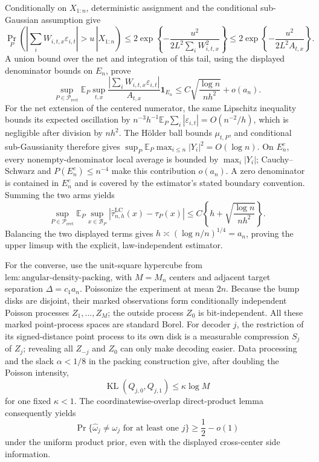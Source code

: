 Conditionally on \(X_{1:n}\), deterministic assignment and the conditional sub-Gaussian assumption give
\[
 \Pr_P\!\left(\left.\left|\sum_iW_{i,t,x}\varepsilon_{i,t}\right|>u\,\right|X_{1:n}\right)
 \leq2\exp\!\left\{-\frac{u^2}{2L^2\sum_iW_{i,t,x}^2}\right\}
 \leq2\exp\!\left\{-\frac{u^2}{2L^2A_{t,x}}\right\}.
\]
A union bound over the net and integration of this tail, using the displayed denominator bounds on \(E_n\), prove
\[
 \sup_{P\in\mathcal P_{\mathrm{rect}}}
 \mathbb E_P\sup_{t,x}
 \frac{\left|\sum_iW_{i,t,x}\varepsilon_{i,t}\right|}{A_{t,x}}
 \mathbf 1_{E_n}
 \leq C\sqrt{\frac{\log n}{nh^2}}+o(a_n).
\]
For the net extension of the centered numerator, the same Lipschitz inequality bounds its expected oscillation by \(n^{-3}h^{-1}\mathbb E_P\sum_i|\varepsilon_{i,t}|=O(n^{-2}/h)\), which is negligible after division by \(nh^2\).  The H\"older ball bounds \(\mu_{t,P}\), and conditional sub-Gaussianity therefore gives \(\sup_P\mathbb E_P\max_{i\leq n}|Y_i|^2=O(\log n)\).  On \(E_n^c\), every nonempty-denominator local average is bounded by \(\max_i|Y_i|\); Cauchy--Schwarz and \(P(E_n^c)\leq n^{-4}\) make this contribution \(o(a_n)\).  A zero denominator is contained in \(E_n^c\) and is covered by the estimator's stated boundary convention.  Summing the two arms yields
\[
 \sup_{P\in\mathcal P_{\mathrm{rect}}}
 \mathbb E_P\sup_{x\in\mathcal B_P}
 |\widehat\tau^{\mathrm{LC}}_{n,h}(x)-\tau_P(x)|
 \leq C\left\{h+\sqrt{\frac{\log n}{nh^2}}\right\}.
\]
Balancing the two displayed terms gives \(h\asymp(\log n/n)^{1/4}=a_n\), proving the upper limsup with the explicit, law-independent estimator.

For the converse, use the unit-square hypercube from \(\mathrm{lem:angular\text{-}density\text{-}packing}\), with \(M=M_n\) centers and adjacent target separation \(\Delta=c_1a_n\).  Poissonize the experiment at mean \(2n\).  Because the bump disks are disjoint, their marked observations form conditionally independent Poisson processes \(Z_1,\ldots,Z_M\); the outside process \(Z_0\) is bit-independent.  All these marked point-process spaces are standard Borel.  For decoder \(j\), the restriction of its signed-distance point process to its own disk is a measurable compression \(S_j\) of \(Z_j\); revealing all \(Z_{-j}\) and \(Z_0\) can only make decoding easier.  Data processing and the slack \(\alpha<1/8\) in the packing construction give, after doubling the Poisson intensity,
\[
 \operatorname{KL}(Q_{j,0},Q_{j,1})\leq\kappa\log M
\]
for one fixed \(\kappa<1\).  The coordinatewise-overlap direct-product lemma consequently yields
\[
 \Pr\{\widehat\omega_j\neq\omega_j\text{ for at least one }j\}\geq\frac12-o(1)
\]
under the uniform product prior, even with the displayed cross-center side information.

